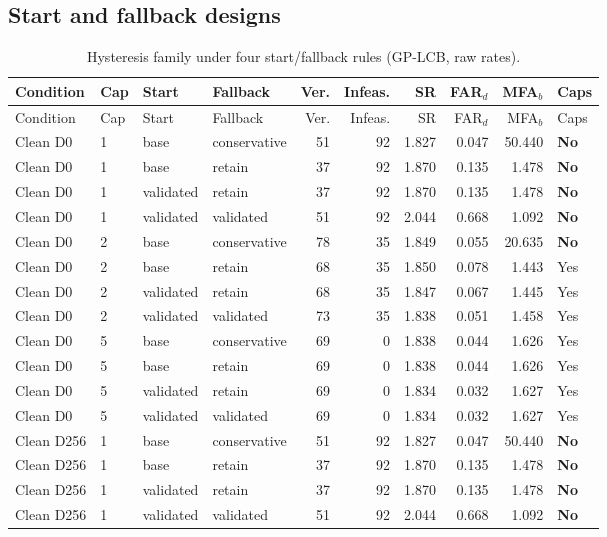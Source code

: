 \subsection{Start and fallback designs}
{\footnotesize\setlength{\tabcolsep}{4pt}
\begin{longtable}{llllrrrrrl}
\caption{Hysteresis family under four start/fallback rules (GP-LCB, raw rates).}\label{tab:s7_fallback}\\
\toprule
Condition & Cap & Start & Fallback & Ver. & Infeas. & SR & FAR$_d$ & MFA$_b$ & Caps\\
\midrule
\endfirsthead
\toprule
Condition & Cap & Start & Fallback & Ver. & Infeas. & SR & FAR$_d$ & MFA$_b$ & Caps\\
\midrule
\endhead
\bottomrule
\endfoot
Clean D0 & 1 & base & conservative & 51 & 92 & 1.827 & 0.047 & 50.440 & \textbf{No}\\
Clean D0 & 1 & base & retain & 37 & 92 & 1.870 & 0.135 & 1.478 & \textbf{No}\\
Clean D0 & 1 & validated & retain & 37 & 92 & 1.870 & 0.135 & 1.478 & \textbf{No}\\
Clean D0 & 1 & validated & validated & 51 & 92 & 2.044 & 0.668 & 1.092 & \textbf{No}\\
Clean D0 & 2 & base & conservative & 78 & 35 & 1.849 & 0.055 & 20.635 & \textbf{No}\\
Clean D0 & 2 & base & retain & 68 & 35 & 1.850 & 0.078 & 1.443 & Yes\\
Clean D0 & 2 & validated & retain & 68 & 35 & 1.847 & 0.067 & 1.445 & Yes\\
Clean D0 & 2 & validated & validated & 73 & 35 & 1.838 & 0.051 & 1.458 & Yes\\
Clean D0 & 5 & base & conservative & 69 & 0 & 1.838 & 0.044 & 1.626 & Yes\\
Clean D0 & 5 & base & retain & 69 & 0 & 1.838 & 0.044 & 1.626 & Yes\\
Clean D0 & 5 & validated & retain & 69 & 0 & 1.834 & 0.032 & 1.627 & Yes\\
Clean D0 & 5 & validated & validated & 69 & 0 & 1.834 & 0.032 & 1.627 & Yes\\
Clean D256 & 1 & base & conservative & 51 & 92 & 1.827 & 0.047 & 50.440 & \textbf{No}\\
Clean D256 & 1 & base & retain & 37 & 92 & 1.870 & 0.135 & 1.478 & \textbf{No}\\
Clean D256 & 1 & validated & retain & 37 & 92 & 1.870 & 0.135 & 1.478 & \textbf{No}\\
Clean D256 & 1 & validated & validated & 51 & 92 & 2.044 & 0.668 & 1.092 & \textbf{No}\\

\end{longtable}}
